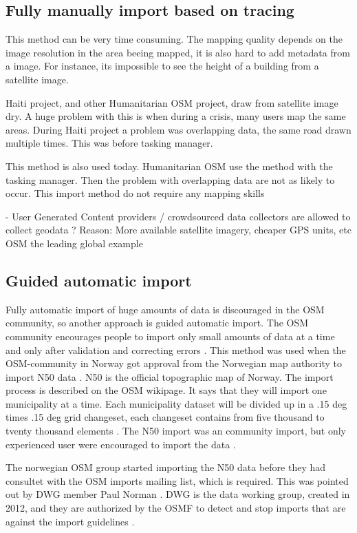 \subsection{Fully manually import based on tracing}
This method can be very time consuming. The mapping quality depends on the image resolution in the area beeing mapped, it is also hard to add metadata from a image. For instance, its impossible to see the height of a building from a satellite image. 

Haiti project, and other Humanitarian OSM project, draw from satellite image dry. A huge problem with this is when during a crisis, many users map the same areas. During Haiti project a problem was overlapping data, the same road drawn multiple times. This was before tasking manager. 

This method is also used today. Humanitarian OSM use the method with the tasking manager. Then the problem with overlapping data are not as likely to occur.  This import method do not require any mapping skills

	- User Generated Content providers / crowdsourced data collectors are allowed to collect geodata
		? Reason: More available satellite imagery, cheaper GPS units, etc
OSM the leading global example %



\subsection{Guided automatic import}\label{guidedautoimp}
Fully automatic import of huge amounts of data is discouraged in the OSM community, so another approach is guided automatic import. The OSM community encourages people to import only small amounts of data at a time and only after validation and correcting errors \cite{Mehus2014}. This method was used when the OSM-community in Norway got approval from the Norwegian map authority to import N50 data \cite{Kihle2014}. N50 is the official topographic map of Norway. The import process is described on the OSM wikipage. It says that they will import one municipality at a time. Each municipality dataset will be divided up in a .15 deg times .15 deg grid changeset, each changeset contains from five thousand to tventy thousand elements \cite{OSMN502014}. The N50 import was an community import, but only experienced user were encouraged to import the data \cite{Mehus2014}. 

The norwegian OSM group started importing the N50 data before they had consultet with the OSM imports mailing list, which is required. This was pointed out by DWG member Paul Norman \cite{Mehus2014}.  DWG is the data working group, created in 2012, and they are authorized by the OSMF to detect and stop imports that are against the import guidelines \cite{OSMDWG}. 

